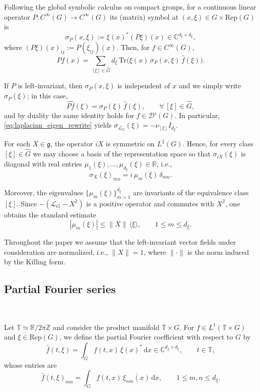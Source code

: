 \documentclass[11pt,reqno]{amsart}
\numberwithin{equation}{section}
\begin{document}
	Following the global symbolic calculus on compact groups, for a continuous linear operator
	$P:C^\infty(G)\to C^\infty(G)$ its (matrix) symbol at $(x,\xi)\in G\times \mathrm{Rep}(G)$ is
	\[
	\sigma_P(x,\xi):=\xi(x)^*(P\xi)(x)\in\mathbb{C}^{d_\xi\times d_\xi},
	\]
	where $(P\xi)(x)_{ij}:=P(\xi_{ij})(x)$.
	Then, for $f\in C^\infty(G)$,
	\[
	Pf(x)=\sum_{[\xi]\in\widehat{G}} d_\xi\,\mathrm{Tr}\bigl(\xi(x)\,\sigma_P(x,\xi)\,\widehat{f}(\xi)\bigr).
	\]
	
	If $P$ is left-invariant, then $\sigma_P(x,\xi)$ is independent of $x$ and we simply write $\sigma_P(\xi)$; in this case,
	\[
	\widehat{Pf}(\xi)=\sigma_P(\xi)\,\widehat{f}(\xi),\qquad\forall\,[\xi]\in\widehat{G},
	\]
	and by duality the same identity holds for $f\in\mathcal{D}'(G)$. In particular, \eqref{eq:laplacian_eigen_rewrite} yields
	$\sigma_{\mathcal{L}_G}(\xi)=-\nu_{[\xi]}I_{d_\xi}$.
	
	For each $X\in\mathfrak g$, the operator $iX$ is symmetric on $L^2(G)$.
	Hence, for every class $[\xi]\in\widehat{G}$ we may choose a basis of the representation space so that
	$\sigma_{iX}(\xi)$ is diagonal with real entries $\mu_1(\xi),\dots,\mu_{d_\xi}(\xi)\in\mathbb{R}$, i.e.,
	\[
	\sigma_X(\xi)_{mn}= i\,\mu_m(\xi)\,\delta_{mn}.
	\]
	
	Moreover, the eigenvalues $\{\mu_m(\xi)\}_{m=1}^{d_\xi}$ are invariants of the equivalence class $[\xi]$.
	Since $-(\mathcal{L}_G-X^2)$ is a positive operator and commutes with $X^2$, one obtains the standard estimate
	\begin{equation*}\label{eq:mu_bound_rewrite}
		|\mu_m(\xi)|\le \|X\|\,\langle\xi\rangle,\qquad 1\le m\le d_\xi.
	\end{equation*}
	
	Throughout the paper we assume that the left-invariant vector fields under consideration are normalized, i.e., $\|X\|=1$, where $\|\cdot\|$ is the norm induced by the Killing form.
	
	
	\subsection{Partial Fourier series} \label{subsec:partial_fourier} \
	
	Let $\mathbb{T}\simeq\mathbb{R}/2\pi\mathbb{Z}$ %
	and consider the product manifold $\mathbb{T}\times G$.
	For $f\in L^1(\mathbb{T}\times G)$ and $\xi\in\mathrm{Rep}(G)$, we define the partial Fourier coefficient with respect to $G$ by
	\[
	\widehat{f}(t,\xi)=\int_G f(t,x)\,\xi(x)^*\,\mathrm{d}x\in\mathbb{C}^{d_\xi\times d_\xi},\qquad t\in\mathbb{T},
	\]
	whose entries are
	\[
	\widehat{f}(t,\xi)_{mn}=\int_G f(t,x)\,\overline{\xi_{nm}(x)}\,\mathrm{d}x,\qquad 1\le m,n\le d_\xi.
	\]
	
\end{document}
